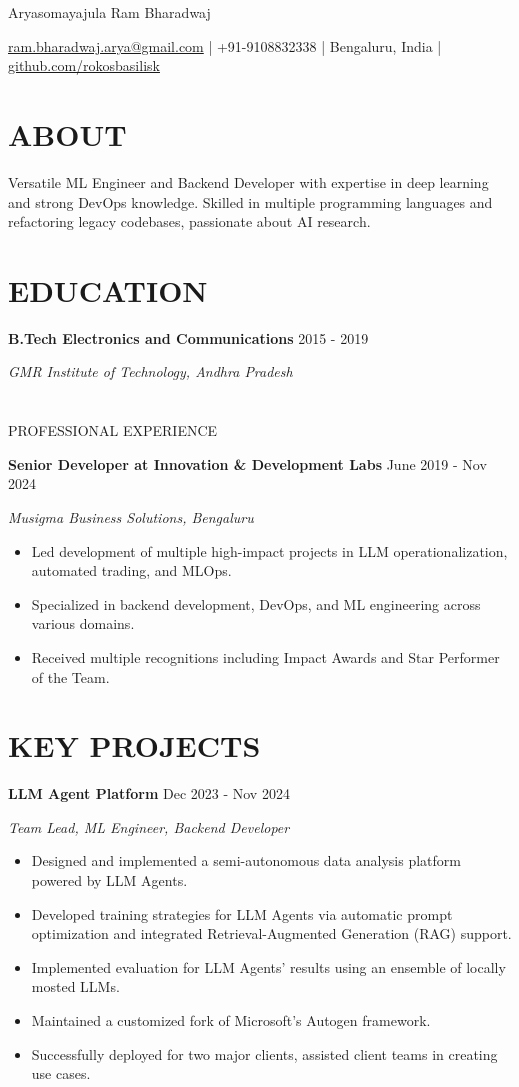 \documentclass[fontsize=11pt]{article}
\newcommand{\MyName}[1]{
    \Huge \usefont{OT1}{phv}{b}{n} \hfill #1
    \par \normalsize \normalfont}
\newcommand{\NewPart}[1]{\section*{\uppercase{#1}}}
\newcommand{\EducationEntry}[4]{
    \noindent \textbf{#1} \hfill {#2} \par
    \noindent \textit{#3} \par
    \noindent \small #4
    \normalsize \par}
\newcommand{\WorkEntry}[4]{
    \noindent \textbf{#1} \hfill {#2} \par
    \noindent \textit{#3} \par
    \noindent \small #4
    \normalsize \par}
\newcommand{\ProjectEntry}[4]{
    \noindent \textbf{#1} \hfill {#2} \par
    \noindent \textit{#3} \par
    \noindent \small #4
    \normalsize \par}
\newcommand{\AboutEntry}[1]{
    \noindent #1 \par}
\begin{document}
\MyName{Aryasomayajula Ram Bharadwaj}
\bigskip

{\small \hfill \href{mailto:ram.bharadwaj.arya@gmail.com}{ram.bharadwaj.arya@gmail.com} | +91-9108832338 | Bengaluru, India | \href{https://github.com/rokosbasilisk}{github.com/rokosbasilisk}}

\NewPart{ABOUT}
\AboutEntry{Versatile ML Engineer and Backend Developer with expertise in deep learning and strong DevOps knowledge. Skilled in multiple programming languages and refactoring legacy codebases, passionate about AI research.}

\NewPart{EDUCATION}
\EducationEntry
{B.Tech Electronics and Communications}
{2015 - 2019}
{GMR Institute of Technology, Andhra Pradesh}

\NewPart{PROFESSIONAL EXPERIENCE}

\WorkEntry
{Senior Developer at Innovation \& Development Labs}
{June 2019 - Nov 2024}
{Musigma Business Solutions, Bengaluru}
{%
\begin{itemize}
\item Led development of multiple high-impact projects in LLM operationalization, automated trading, and MLOps.
\item Specialized in backend development, DevOps, and ML engineering across various domains.
\item Received multiple recognitions including Impact Awards and Star Performer of the Team.
\end{itemize}}

\NewPart{KEY PROJECTS}

\ProjectEntry{LLM Agent Platform}{Dec 2023 - Nov 2024}{Team Lead, ML Engineer, Backend Developer}
{%
\begin{itemize}
\item Designed and implemented a semi-autonomous data analysis platform powered by LLM Agents.
\item Developed training strategies for LLM Agents via automatic prompt optimization and integrated Retrieval-Augmented Generation (RAG) support.
\item Implemented evaluation for LLM Agents' results using an ensemble of locally mosted LLMs.
\item Maintained a customized fork of Microsoft's Autogen framework.
\item Successfully deployed for two major clients, assisted client teams in creating use cases.
\end{itemize}}
\end{document}
